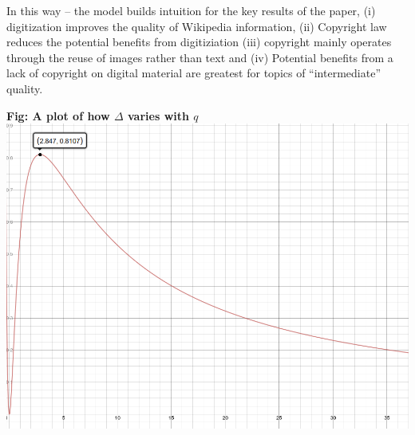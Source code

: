 In this way -- the model builds intuition for the key results of the paper, (i) digitization improves the quality of Wikipedia information, (ii) Copyright law reduces the potential benefits from digitiziation (iii) copyright mainly operates through the reuse of images rather than text and (iv) Potential benefits from a lack of copyright on digital material are greatest for topics of ``intermediate'' quality. 

\begin{center}
\textbf{Fig: A plot of how $\Delta$ varies with $q$}
\includegraphics[scale = 0.3]{../tables/model.png}
\end{center}
  









































